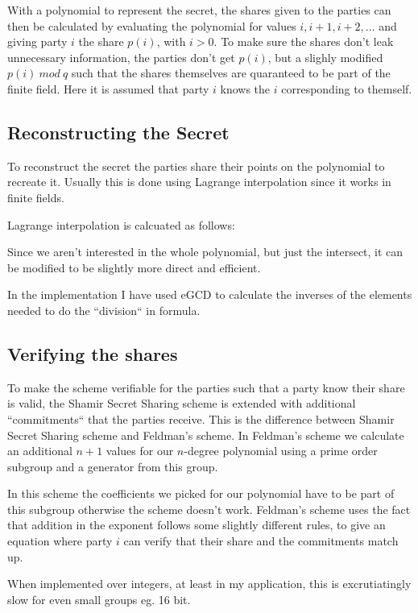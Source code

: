 \documentclass[a4paper,oneside,12pt,final]{article}
\begin{document}
With a polynomial to represent the secret, the shares given to the parties can
then be calculated by evaluating the polynomial for values $i, i+1, i+2, ...$
and giving party $i$ the share $p(i)$, with $i > 0$. To make sure the shares
don't leak unnecessary information, the parties don't get $p(i)$, but a slighly
modified $p(i)\ mod\ q$ such that the shares themselves are quaranteed to be
part of the finite field. Here it is assumed that party $i$ knows the $i$
corresponding to themself.

\subsection{Reconstructing the Secret}

To reconstruct the secret the parties share their points on the polynomial to
recreate it. Usually this is done using Lagrange interpolation since it works in
finite fields.

Lagrange interpolation is calcuated as follows:


Since we aren't interested in the whole polynomial, but just the intersect, it
can be modified to be slightly more direct and efficient.

In the implementation I have used eGCD to calculate the inverses of the elements
needed to do the ``division`` in formula. 

\subsection{Verifying the shares}

To make the scheme verifiable for the parties such that a party know their share
is valid, the Shamir Secret Sharing scheme is extended with additional
``commitments`` that the parties receive. This is the difference between Shamir
Secret Sharing scheme and Feldman's scheme. In Feldman's scheme we calculate an
additional $n+1$ values for our $n$-degree polynomial using a prime order
subgroup and a generator from this group. 

In this scheme the coefficients we picked for our polynomial have to be part of
this subgroup otherwise the scheme doesn't work. Feldman's scheme uses the fact
that addition in the exponent follows some slightly different rules, to give an
equation where party $i$ can verify that their share and the commitments match
up. 



When implemented over integers, at least in my application, this is
excrutiatingly slow for even small groups eg. 16 bit. 
\end{document}
